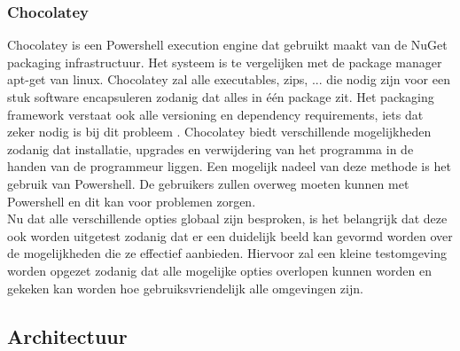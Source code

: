 \documentclass{article}
\begin{document}
\subsubsection{Chocolatey \citep{chocoMain}}
Chocolatey is een Powershell execution engine dat gebruikt maakt van de NuGet packaging infrastructuur.
Het systeem is te vergelijken met de package manager apt-get van linux.
Chocolatey zal alle executables, zips, ... die nodig zijn voor een stuk software encapsuleren zodanig dat alles in \'e\'en package zit.
Het packaging framework verstaat ook alle versioning en dependency requirements, iets dat zeker nodig is bij dit probleem \citep{chocoDoc}.
Chocolatey biedt verschillende mogelijkheden zodanig dat installatie, upgrades en verwijdering van het programma in de handen van de programmeur liggen.
Een mogelijk nadeel van deze methode is het gebruik van Powershell. 
De gebruikers zullen overweg moeten kunnen met Powershell en dit kan voor problemen zorgen. \\[3mm]
Nu dat alle verschillende opties globaal zijn besproken, is het belangrijk dat deze ook worden uitgetest zodanig dat er een duidelijk beeld kan gevormd worden over de mogelijkheden die ze effectief aanbieden.
Hiervoor zal een kleine testomgeving worden opgezet zodanig dat alle mogelijke opties overlopen kunnen worden en gekeken kan worden hoe gebruiksvriendelijk alle omgevingen zijn.

\subsection{Architectuur}


%

\end{document}
